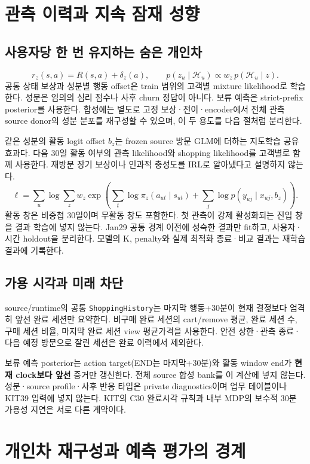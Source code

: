 \documentclass[11pt,a4paper]{article}
\newcommand{\code}[1]{{\ttfamily\footnotesize\nolinkurl{#1}}}
\newcommand{\page}{\clearpage}
\begin{document}
\page
\section{관측 이력과 지속 잠재 성향}
\subsection{사용자당 한 번 유지하는 숨은 개인차}
\[
r_z(s,a)=R(s,a)+\delta_z(a),\qquad
p(z_u\mid\mathcal H_u)\propto w_z\,p(\mathcal H_u\mid z).
\]
공통 상태 보상과 성분별 행동 offset은 train 범위의 고객별 mixture likelihood로 학습한다. 성분은 임의의 심리 점수나 사후 churn 정답이 아니다. 보류 예측은 strict-prefix posterior를 사용한다. 합성에는 별도로 고정 보상·전이·encoder에서 전체 관측 source donor의 성분 분포를 재구성할 수 있으며, 이 두 용도를 다음 절처럼 분리한다.

같은 성분의 활동 logit offset $b_z$는 frozen source 방문 GLM에 더하는 지도학습 공유효과다. 다음 30일 활동 여부의 관측 likelihood와 shopping likelihood를 고객별로 함께 사용한다. 재방문 장기 보상이나 인과적 충성도를 IRL로 알아냈다고 설명하지 않는다.
\[
\ell=\sum_u\log\sum_z w_z\exp\!\left(\sum_t\log\pi_z(a_{ut}\mid s_{ut})+
\sum_j\log p(y_{uj}\mid x_{uj},b_z)\right).
\]
활동 창은 비중첩 30일이며 무활동 창도 포함한다. 첫 관측이 강제 활성화되는 진입 창을 결과 학습에 넣지 않는다. Jan29 공통 경계 이전에 성숙한 결과만 fit하고, 사용자·시간 holdout을 분리한다. 모델의 K, penalty와 실제 최적화 종료·비교 결과는 재학습 결과에 기록한다.

\subsection{가용 시각과 미래 차단}
source/runtime의 공통 \code{ShoppingHistory}는 마지막 행동+30분이 현재 결정보다 엄격히 앞선 완료 세션만 요약한다. 비구매 완료 세션의 cart/remove 평균, 완료 세션 수, 구매 세션 비율, 마지막 완료 세션 view 평균가격을 사용한다. 안전 상한·관측 종료·다음 예정 방문으로 잘린 세션은 완료 이력에서 제외한다.

보류 예측 posterior는 action target(END는 마지막+30분)와 활동 window end가 \textbf{현재 clock보다 앞선} 증거만 갱신한다. 전체 source 합성 bank를 이 계산에 넣지 않는다. 성분·source profile·사후 반응 타입은 private diagnostics이며 업무 테이블이나 KIT39 입력에 넣지 않는다. KIT의 C30 완료시각 규칙과 내부 MDP의 보수적 30분 가용성 지연은 서로 다른 계약이다.

\page
\section{개인차 재구성과 예측 평가의 경계}
\end{document}
